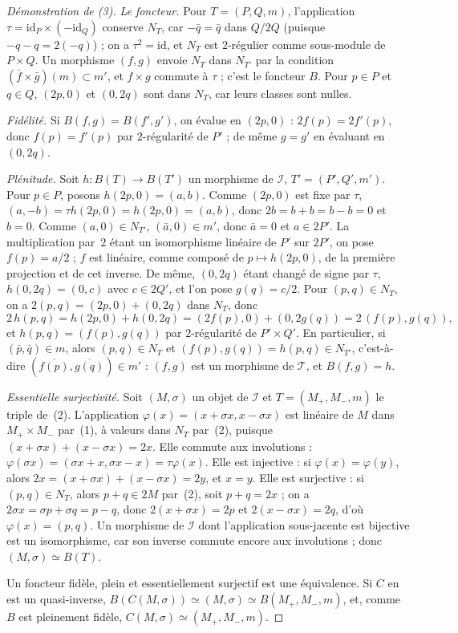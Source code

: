 \begin{proof}[Démonstration de (3)]
\emph{Le foncteur.} Pour $T = (P, Q, m)$, l'application $\tau = \mathrm{id}_P \times (-\mathrm{id}_Q)$ conserve $N_T$, car $-\bar q = \bar q$ dans $Q/2Q$ (puisque $-q - q = 2(-q)$) ; on a $\tau^2 = \mathrm{id}$, et $N_T$ est $2$-régulier comme sous-module de $P \times Q$. Un morphisme $(f, g)$ envoie $N_T$ dans $N_{T'}$ par la condition $(\bar f \times \bar g)(m) \subset m'$, et $f \times g$ commute à $\tau$ ; c'est le foncteur $B$. Pour $p \in P$ et $q \in Q$, $(2p, 0)$ et $(0, 2q)$ sont dans $N_T$, car leurs classes sont nulles.

\emph{Fidélité.} Si $B(f, g) = B(f', g')$, on évalue en $(2p, 0)$ : $2f(p) = 2f'(p)$, donc $f(p) = f'(p)$ par $2$-régularité de $P'$ ; de même $g = g'$ en évaluant en $(0, 2q)$.

\emph{Plénitude.} Soit $h : B(T) \to B(T')$ un morphisme de $\mathcal I$, $T' = (P', Q', m')$. Pour $p \in P$, posons $h(2p, 0) = (a, b)$. Comme $(2p, 0)$ est fixe par $\tau$, $(a, -b) = \tau h(2p, 0) = h(2p, 0) = (a, b)$, donc $2b = b + b = b - b = 0$ et $b = 0$. Comme $(a, 0) \in N_{T'}$, $(\bar a, 0) \in m'$, donc $\bar a = 0$ et $a \in 2P'$. La multiplication par~$2$ étant un isomorphisme linéaire de $P'$ sur $2P'$, on pose $f(p) = a/2$ ; $f$ est linéaire, comme composé de $p \mapsto h(2p, 0)$, de la première projection et de cet inverse. De même, $(0, 2q)$ étant changé de signe par $\tau$, $h(0, 2q) = (0, c)$ avec $c \in 2Q'$, et l'on pose $g(q) = c/2$. Pour $(p, q) \in N_T$, on a $2(p, q) = (2p, 0) + (0, 2q)$ dans $N_T$, donc
\[
2\,h(p, q) = h(2p, 0) + h(0, 2q) = (2f(p), 0) + (0, 2g(q)) = 2\,(f(p), g(q)),
\]
et $h(p, q) = (f(p), g(q))$ par $2$-régularité de $P' \times Q'$. En particulier, si $(\bar p, \bar q) \in m$, alors $(p, q) \in N_T$ et $(f(p), g(q)) = h(p, q) \in N_{T'}$, c'est-à-dire $(\overline{f(p)}, \overline{g(q)}) \in m'$ : $(f, g)$ est un morphisme de $\mathcal T$, et $B(f, g) = h$.

\emph{Essentielle surjectivité.} Soit $(M, \sigma)$ un objet de $\mathcal I$ et $T = (M_+, M_-, m)$ le triple de~(2). L'application $\varphi(x) = (x + \sigma x, x - \sigma x)$ est linéaire de $M$ dans $M_+ \times M_-$ par~(1), à valeurs dans $N_T$ par~(2), puisque $(x + \sigma x) + (x - \sigma x) = 2x$. Elle commute aux involutions : $\varphi(\sigma x) = (\sigma x + x, \sigma x - x) = \tau \varphi(x)$. Elle est injective : si $\varphi(x) = \varphi(y)$, alors $2x = (x + \sigma x) + (x - \sigma x) = 2y$, et $x = y$. Elle est surjective : si $(p, q) \in N_T$, alors $p + q \in 2M$ par~(2), soit $p + q = 2x$ ; on a $2\sigma x = \sigma p + \sigma q = p - q$, donc $2(x + \sigma x) = 2p$ et $2(x - \sigma x) = 2q$, d'où $\varphi(x) = (p, q)$. Un morphisme de $\mathcal I$ dont l'application sous-jacente est bijective est un isomorphisme, car son inverse commute encore aux involutions ; donc $(M, \sigma) \simeq B(T)$.

Un foncteur fidèle, plein et essentiellement surjectif est une équivalence. Si $C$ en est un quasi-inverse, $B(C(M, \sigma)) \simeq (M, \sigma) \simeq B(M_+, M_-, m)$, et, comme $B$ est pleinement fidèle, $C(M, \sigma) \simeq (M_+, M_-, m)$.
\end{proof}

